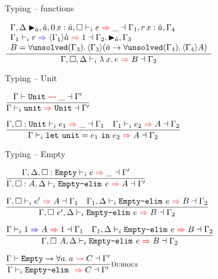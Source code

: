 \documentclass{beamer}
\begin{document}
\begin{frame}{Typing -- functions}
\begin{center}
  $\infrule{\begin{array}{l} \infer{\Gamma, \Delta \marker{\evar{a}}, \evar{a}, \var[\Zero]{x}{\evar{a}}, \emptyhint}{e}{\_}{\Gamma_1, \var[r]{x}{\evar{a}}, \Gamma_4} \\ \newkinding{\Gamma_1}{r}{\substctx{\Gamma_1}{\evar{a}}}{\One}{\Gamma_2, \marker{\evar{a}}, \Gamma_3} \\ B = \ForallI{\texttt{unsolved}(\Gamma_3)} \substctx{\Gamma_3}{(\Fun{\evar{a}}{\ForallI{\texttt{unsolved}(\Gamma_4)}{\substctx{\Gamma_4}{A}}})} \end{array}}{\infer{\Gamma, \emptyhint, \Delta}{\fun{x}{e}}{B}{\Gamma_2}}$
\end{center}

\end{frame}

\begin{frame}{Typing -- Unit}

\begin{center}
  $\infrule{\matching{\Gamma}{\Unit}{\_}{\Gamma'}}{\infer{\Gamma}{\unit}{\Unit}{\Gamma'}}$

  \vspace{2em}

  $\infrule{\infer{\Gamma, \typehint{\Unit}}{e_1}{\_}{\Gamma_1} \quad \infer{\Gamma_1}{e_2}{A}{\Gamma_2}}{\infer{\Gamma}{\unitelim{e_1}{e_2}}{A}{\Gamma_2}}$
\end{center}

\end{frame}

\begin{frame}{Typing -- Empty}

\begin{center}
  $\infrule{\infer{\Gamma, \Delta, \typehint{\Empty}}{e}{\_}{\Gamma'}}{\infer{\Gamma, \typehint{A}, \Delta}{\emptyelim{e}}{A}{\Gamma'}}$

  \vspace{2em}

  $\infrule{\infer{\Gamma, \emptyhint}{e'}{A}{\Gamma_1} \quad \infer{\Gamma_1, \Delta}{\emptyelim{e}}{B}{\Gamma_2}}{\infer{\Gamma, \arghint{e'}, \Delta}{\emptyelim{e}}{B}{\Gamma_2}}$

  \vspace{2em}

  $\infrule{\newkinding{\Gamma}{\One}{A}{\One}{\Gamma_1} \quad \infer{\Gamma_1, \Delta}{\emptyelim{e}}{B}{\Gamma_2}}{\infer{\Gamma, \typearghint{A}, \Delta}{\emptyelim{e}}{B}{\Gamma_2}}$

  \vspace{2em}

  $\infrule[Dubious]{\matching{\Gamma}{\Fun{\Empty}{\ForallI{a}{a}}}{C}{\Gamma'}}{\infer{\Gamma}{\emptyelim{}}{C}{\Gamma'}}$
\end{center}

\end{frame}
\end{document}
